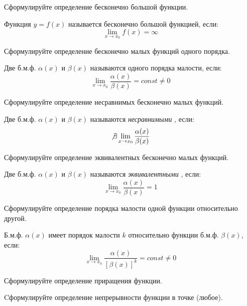 \begin{question}
  Сформулируйте определение бесконечно большой функции.
\end{question}
\begin{answer}
  Функция $y=f(x)$ называется бесконечно большой функцией, если: \[
  \lim_{x \to x_0} f(x) = \infty
  \] 
\end{answer}

\begin{question}
  Сформулируйте определение бесконечно малых функций одного порядка.
\end{question}
\begin{answer}
  Две б.м.ф. $\alpha(x)$ и $\beta(x)$ называются одного порядка малости, если: \[
    \lim_{x \to x_0} \frac{\alpha(x)}{\beta(x)} = const \neq 0
  \] 
\end{answer}

\begin{question}
  Сформулируйте определение несравнимых бесконечно малых функций. 
\end{question}
\begin{answer}
  Две б.м.ф. $\alpha(x)$ и $\beta(x)$ называются \textit{несравнимыми} , если: \[
    \not \exists \lim_{x \to x_0} \frac{\alpha(x)}{\beta(x)}
  \]   
\end{answer}

\begin{question}
  Сформулируйте определение эквивалентных бесконечно малых функций. 
\end{question}
\begin{answer}
  Две б.м.ф. $\alpha(x)$ и $\beta(x)$ называются \textit{эквивалентными} , если: \[
    \lim_{x \to x_0} \frac{\alpha(x)}{\beta(x)} = 1
  \]
\end{answer}

\begin{question}
  Сформулируйте определение порядка малости одной функции относительно
другой.
\end{question}
\begin{answer}
  Б.м.ф. $\alpha(x)$ имеет порядок малости $k$ относительно функции б.м.ф.  $\beta(x)$, если: \[
    \lim_{x \to x_0} \frac{\alpha(x)}{[\beta(x)]^k} = const \neq 0
  \]
\end{answer}

\begin{question}
  Сформулируйте определение приращения функции. 
\end{question}

\begin{question}
  Cформулируйте определение непрерывности функции в точке (любое). 
\end{question}

